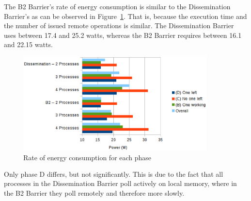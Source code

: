 \documentclass[a4paper, 10pt]{article}
\begin{document}
The B2 Barrier's rate of energy consumption is similar to the Dissemination Barrier's as can be observed in Figure~\ref{fig:d2-power-work-100}.
That is, because the execution time and the number of issued remote operations is similar.
The Dissemination Barrier uses between 17.4 and 25.2 watts, whereas the B2 Barrier requires between 16.1 and 22.15 watts.
\begin{figure}[htbp]
	\centering
	\includegraphics[width=10cm]{charts/d2-power-work-100}
	\caption{Rate of energy consumption for each phase}
	\label{fig:d2-power-work-100}
\end{figure}
Only phase D differs, but not significantly.
This is due to the fact that all processes in the Dissemination Barrier poll actively on local memory, where in the B2 Barrier they poll remotely and therefore more slowly.
\end{document}
